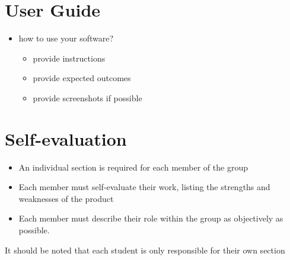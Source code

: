 \documentclass{scrartcl}
\begin{document}
\section{User Guide}\label{user-guide}

\begin{itemize}
  \item how to use your software?

  \begin{itemize}
    \item provide instructions
    \item provide expected outcomes
    \item provide screenshots if possible
  \end{itemize}
\end{itemize}

\section{Self-evaluation}\label{self-evaluation}

\begin{itemize}
  \item An individual section is required for each member of the group
  \item Each member must self-evaluate their work, listing the strengths and
  weaknesses of the product
  \item Each member must describe their role within the group as objectively
  as possible.
\end{itemize}

It should be noted that each student is only responsible for their own
section


\cite{adams1995hitchhiker} %
\end{document}
